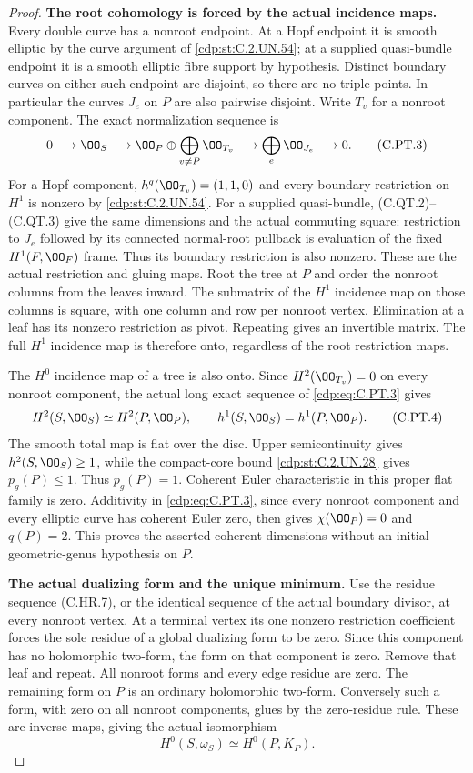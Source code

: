 \begin{proof}
\par\medskip\noindent\textbf{The root cohomology is forced by the actual incidence maps.}
Every double curve has a nonroot endpoint. At a Hopf
endpoint it is smooth elliptic by the curve argument of
\ref{cdp:st:C.2.UN.54}; at a supplied quasi-bundle endpoint it is a smooth
elliptic fibre support by hypothesis. Distinct boundary
curves on either such endpoint are disjoint, so there
are no triple points. In particular the curves $J_e$
on $P$ are also pairwise disjoint. Write $T_v$ for a
nonroot component. The exact normalization sequence is
\[
 0\longrightarrow\OO_S
 \longrightarrow\OO_P\oplus\bigoplus_{v\ne P}\OO_{T_v}
 \longrightarrow\bigoplus_e\OO_{J_e}\longrightarrow0.
 \tag{C.PT.3}\label{cdp:eq:C.PT.3}
\]
For a Hopf component, $h^q(\OO_{T_v})=(1,1,0)$ and
every boundary restriction on $H^1$ is nonzero by \ref{cdp:st:C.2.UN.54}.
For a supplied quasi-bundle, (C.QT.2)--(C.QT.3) give
the same dimensions and the actual commuting square:
restriction to $J_e$ followed by its connected normal-root
pullback is evaluation of the fixed $H^1(F,\OO_F)$
frame. Thus its boundary restriction is also nonzero.
These are the actual restriction and gluing maps.
Root the tree at $P$ and order the nonroot columns from the
leaves inward. The submatrix of the $H^1$ incidence map
on those columns is square, with one column and row per
nonroot vertex. Elimination at a leaf has its nonzero
restriction as pivot. Repeating gives an invertible
matrix. The full $H^1$ incidence map is therefore onto,
regardless of the root restriction maps.

The $H^0$ incidence map of a tree is also onto. Since
$H^2(\OO_{T_v})=0$ on every nonroot component, the actual long exact
sequence of \eqref{cdp:eq:C.PT.3} gives
\[
 H^2(S,\OO_S)\simeq H^2(P,\OO_P),\qquad
                 h^1(S,\OO_S)=h^1(P,\OO_P).
 \tag{C.PT.4}\label{cdp:eq:C.PT.4}
\]
The smooth total map is flat over the disc. Upper
semicontinuity gives $h^2(S,\OO_S)\ge1$, while the
compact-core bound \ref{cdp:st:C.2.UN.28} gives $p_g(P)\le1$. Thus
$p_g(P)=1$. Coherent Euler characteristic in this proper
flat family is zero. Additivity in \eqref{cdp:eq:C.PT.3}, since every
nonroot component and every elliptic curve has coherent Euler zero,
then gives $\chi(\OO_P)=0$ and $q(P)=2$. This proves
the asserted coherent dimensions without an initial
geometric-genus hypothesis on $P$.

\par\medskip\noindent\textbf{The actual dualizing form and the unique minimum.}
Use the residue sequence (C.HR.7), or the identical
sequence of the actual boundary divisor, at every
nonroot vertex. At a terminal vertex its one nonzero restriction
coefficient forces the sole residue of a global
dualizing form to be zero. Since this component has no
holomorphic two-form, the form on that component is zero.
Remove that leaf and repeat. All nonroot forms and every
edge residue are zero. The remaining form on $P$ is
an ordinary holomorphic two-form. Conversely such a form,
with zero on all nonroot components, glues by the zero-residue
rule. These are inverse maps, giving the actual isomorphism
\[
                  H^0(S,\omega_S)\simeq H^0(P,K_P).
 \tag{C.PT.5}\label{cdp:eq:C.PT.5}
\]


\end{proof}
